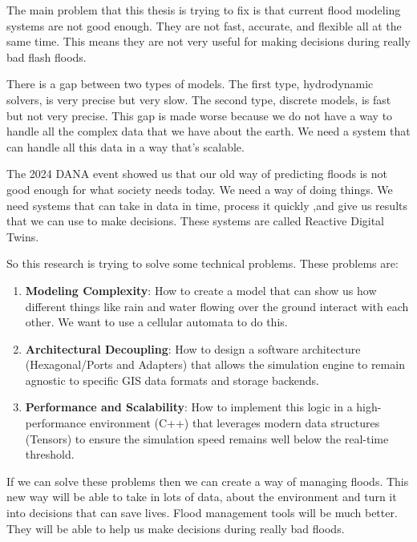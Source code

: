 The main problem that this thesis is trying to fix is that current flood modeling systems are not good enough. They are not fast, 
accurate, and flexible all at the same time. This means they are not very useful for making decisions during really bad flash floods.

There is a gap between two types of models. The first type, hydrodynamic solvers, is very precise but very slow. The second type, 
discrete models, is fast but not very precise. This gap is made worse because we do not have a way to handle all the complex data 
that we have about the earth. We need a system that can handle all this data in a way that's scalable.

The 2024 DANA event showed us that our old way of predicting floods is not good enough for what society needs today. We need a way 
of doing things. We need systems that can take in data in time, process it quickly ,and give us results that we can use to make 
decisions. These systems are called Reactive Digital Twins.

So this research is trying to solve some technical problems. These problems are:

\begin{enumerate}
    \item \textbf{Modeling Complexity}: How to create a model that can show us how different things like rain and water flowing over 
    the ground interact with each other. We want to use a cellular automata to do this.
    \item \textbf{Architectural Decoupling}: How to design a software architecture (Hexagonal/Ports and Adapters) that 
    allows the simulation engine to remain agnostic to specific GIS data formats and storage backends.
    \item \textbf{Performance and Scalability}: How to implement this logic in a high-performance environment (C++) that 
    leverages modern data structures (Tensors) to ensure the simulation speed remains well below the real-time threshold.
\end{enumerate}

If we can solve these problems then we can create a way of managing floods. This new way will be able to take in lots of data, about 
the environment and turn it into decisions that can save lives. Flood management tools will be much better. They will be able to help 
us make decisions during really bad floods.
